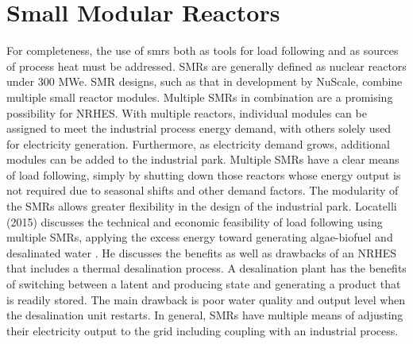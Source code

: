 \section{Small Modular Reactors}
For completeness, the use of \ac{smrs} both as tools for load following and as sources of process heat must be addressed. SMRs are generally defined as nuclear reactors under 300 MWe. SMR designs, such as that in development by NuScale, combine multiple small reactor modules. Multiple SMRs in combination are a promising possibility for NRHES.  With multiple reactors, individual modules can be assigned to meet the industrial process energy demand, with others solely used for electricity generation. Furthermore, as electricity demand grows, additional modules can be added to the industrial park. Multiple SMRs have a clear means of load following, simply by shutting down those reactors whose energy output is not required due to seasonal shifts and other demand factors. The modularity of the SMRs allows greater flexibility in the design of the industrial park.  Locatelli (2015) discusses the technical and economic feasibility of load following using multiple SMRs, applying the excess energy toward generating algae-biofuel and desalinated water \cite{Locatelli2015}. He discusses the benefits as well as drawbacks of an NRHES that includes a thermal desalination process. A desalination plant has the benefits of switching between a latent and producing state and generating a product that is readily stored. The main drawback is poor water quality and output level when the desalination unit restarts. In general, SMRs have multiple means of adjusting their electricity output to the grid including coupling with an industrial process.

